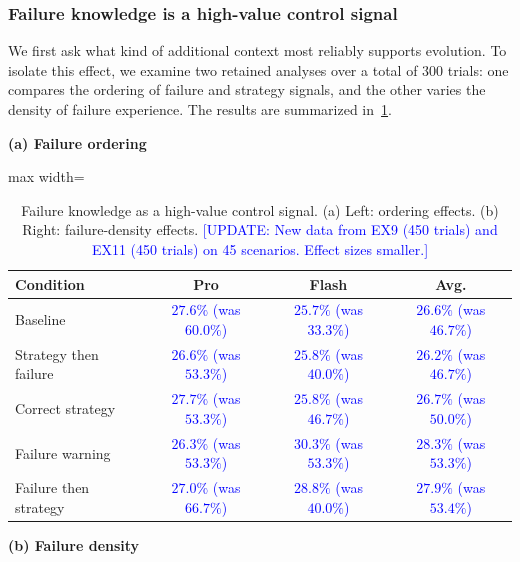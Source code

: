 \documentclass{article}
\newcommand{\blue}[1]{\textcolor{blue}{#1}}
\begin{document}
\subsubsection{Failure knowledge is a high-value control signal}

We first ask what kind of additional context most reliably supports evolution. 
To isolate this effect, we examine two retained analyses over a total of $300$ trials: one compares the ordering of failure and strategy signals, and the other varies the density of failure experience. 
The results are summarized in~\cref{tab:failure_signal}.

\begin{table}[h]
\centering
\caption{Failure knowledge as a high-value control signal. (a) Left: ordering effects. (b) Right: failure-density effects. \blue{[UPDATE: New data from EX9 (450 trials) and EX11 (450 trials) on 45 scenarios. Effect sizes smaller.]}}
\label{tab:failure_signal}
\begin{minipage}[t]{0.5\textwidth}
\centering
\small
\textbf{(a) Failure ordering}\\[3pt]
\begin{adjustbox}{max width=\textwidth}
\begin{tabular}{lccc}
\toprule
\textbf{Condition} & \textbf{Pro} & \textbf{Flash} & \textbf{Avg.} \\
\midrule
Baseline & \blue{$27.6\%$ (was $60.0\%$)} & \blue{$25.7\%$ (was $33.3\%$)} & \blue{$26.6\%$ (was $46.7\%$)} \\
Strategy then failure & \blue{$26.6\%$ (was $53.3\%$)} & \blue{$25.8\%$ (was $40.0\%$)} & \blue{$26.2\%$ (was $46.7\%$)} \\
Correct strategy & \blue{$27.7\%$ (was $53.3\%$)} & \blue{$25.8\%$ (was $46.7\%$)} & \blue{$26.7\%$ (was $50.0\%$)} \\
\cellcolor{bestRow}Failure warning & \blue{$26.3\%$ (was $53.3\%$)} & \cellcolor{bestRow}\blue{$30.3\%$ (was $53.3\%$)} & \cellcolor{bestRow}\blue{$28.3\%$ (was $53.3\%$)} \\
\cellcolor{bestRow}Failure then strategy & \blue{$27.0\%$ (was $66.7\%$)} & \blue{$28.8\%$ (was $40.0\%$)} & \cellcolor{bestRow}\blue{$27.9\%$ (was $53.4\%$)} \\
\bottomrule
\end{tabular}
\end{adjustbox}
\end{minipage}
\hfill
\begin{minipage}[t]{0.48\textwidth}
\centering
\small
\textbf{(b) Failure density}\\[3pt]

\end{minipage}
\end{table}
\end{document}
